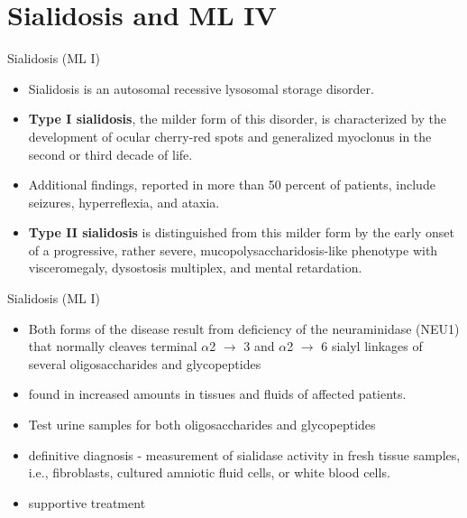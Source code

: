 \documentclass[presentation, smaller]{beamer}
\begin{document}
\section{Sialidosis and ML IV}
\label{sec:orgheadline17}

\begin{frame}[label={sec:orgheadline12}]{Sialidosis (ML I)}
\begin{itemize}
\item Sialidosis is an autosomal recessive lysosomal storage disorder.

\item \textbf{Type I sialidosis}, the milder form of this disorder, is
characterized by the development of ocular cherry-red spots and
generalized myoclonus in the second or third decade of life.
\item Additional findings, reported in more than 50 percent of patients,
include seizures, hyperreflexia, and ataxia.

\item \textbf{Type II sialidosis} is distinguished from this milder form by the
early onset of a progressive, rather severe,
mucopolysaccharidosis-like phenotype with visceromegaly, dysostosis
multiplex, and mental retardation.
\end{itemize}
\end{frame}

\begin{frame}[label={sec:orgheadline13}]{Sialidosis (ML I)}
\begin{itemize}
\item Both forms of the disease result from deficiency of the
neuraminidase (NEU1) that normally cleaves terminal \(\alpha\)2 \(\to\) 3 and
\(\alpha\)2 \(\to\) 6 sialyl linkages of several oligosaccharides and glycopeptides

\item found in increased amounts in tissues and fluids of affected patients.

\item Test urine samples for both oligosaccharides and glycopeptides

\item definitive diagnosis - measurement of sialidase activity in fresh tissue
samples, i.e., fibroblasts, cultured amniotic fluid cells, or white
blood cells.

\item supportive treatment
\end{itemize}
\end{frame}
\end{document}
